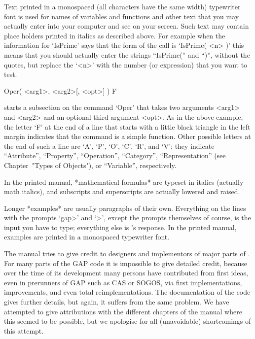 
Text printed in a monospaced (all characters have the same width)
typewriter font is used for names of variables and functions
and other text that you may actually enter into your computer
and see on your screen.  Such text may contain
place holders printed in italics as described above.  For example
when the information for `IsPrime' says that the form of the call is
`IsPrime( <n> )' this means that you should actually
enter the strings ``IsPrime('' and ``)'', without the quotes,
but replace the `<n>' with the number (or expression)
that you want to test.

\)Oper( <arg1>, <arg2>[, <opt>] ) F

starts a subsection on the command `Oper' that takes two arguments <arg1>
and <arg2> and an optional third argument <opt>.
As in the above example, the letter `F' at the end of a line that starts
with a little black triangle in the left margin indicates that the command
is a simple function.
Other possible letters at the end of such a line are
`A', `P', `O', `C', `R', and `V';
they indicate ``Attribute'', ``Property'', ``Operation'', ``Category'',
``Representation'' (see Chapter~"Types of Objects"), or ``Variable'',
respectively.

In the printed manual, *mathematical formulas* are typeset in italics
(actually math italics), and subscripts and superscripts are actually
lowered and raised.

Longer *examples* are usually paragraphs of their own.
Everything on the lines with the prompts `gap>' and `>', except
the prompts themselves of course, is the input you have to type;
everything else is {\GAP}'s response. In the printed manual,
examples are printed in a monospaced typewriter font.


The manual tries to give credit to designers and implementors of major parts
of {\GAP}. For many parts of  the GAP code it is  impossible to give
detailed credit, because over the time of its  development many persons have
contributed from first ideas, even in prerunners of GAP such as CAS or
SOGOS, via first  implementations, improvements, and even  total
reimplementations.  The documentation of the code gives further details, but
again, it suffers from the same problem.  We  have attempted to give
attributions with the different chapters of   the manual where this seemed
to be possible, but  we  apologise for all (unavoidable) shortcomings of
this attempt.


